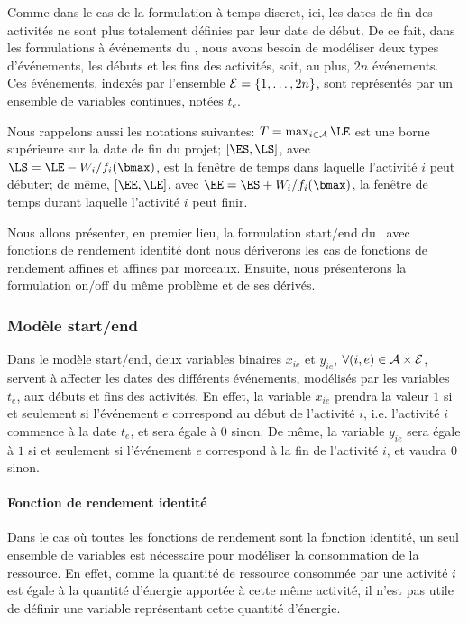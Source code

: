Comme dans le cas de la formulation à temps discret, ici, les dates de
fin des activités ne sont plus totalement définies par leur date de
début. De ce fait, dans les formulations à événements du \CECSP, nous
avons besoin de modéliser deux types d'événements, les débuts et les
fins des activités, soit, au plus, $2n$ événements. Ces événements,
indexés par l'ensemble ${\cal E}=\{1,\dots,2n\}$, sont représentés par un
ensemble de variables continues, notées $t_e$.

Nous rappelons aussi les notations suivantes: $T=\max_{i \in \A}
\LE$ est une borne supérieure sur la date de fin du projet;
$[\ES,\LS]$, avec $\LS= \LE-W_i/f_i(\bmax)$, est la fenêtre de temps
dans laquelle l'activité $i$ peut débuter; de même, $[\EE,\LE]$,
avec $\EE=\ES + W_i/f_i(\bmax)$, la fenêtre de temps durant laquelle
l'activité $i$ peut finir.

Nous allons présenter, en premier lieu, la formulation start/end du
\CECSP~avec fonctions de rendement identité dont nous dériverons 
les cas de fonctions de rendement affines et affines par morceaux.
Ensuite, nous présenterons la formulation on/off du même problème et
de ses dérivés.

\subsubsection{Modèle start/end}

Dans le modèle start/end, deux variables binaires $x_{ie}$ et
$y_{ie}$, $\forall (i,e) \in {\cal A}\times {\cal E}$, 
servent à affecter les dates des différents événements, modélisés par
les variables $t_e$, aux débuts et fins des activités. En effet, la
variable $x_{ie}$ prendra la valeur $1$ si et seulement si l'événement
$e$ correspond au début de l'activité $i$, i.e. l'activité $i$
commence à la date $t_e$, et sera égale à $0$ sinon. De même, la
variable $y_{ie}$ sera égale à $1$ si et seulement si l'événement $e$
correspond à la fin de l'activité $i$, et vaudra $0$ sinon.

\paragraph{Fonction de rendement identité}

Dans le cas où toutes les fonctions de rendement sont la fonction
identité, un seul ensemble de variables est nécessaire pour modéliser
la consommation de la ressource. En effet, comme la quantité de
ressource consommée par une activité $i$ est égale à la quantité
d'énergie apportée à cette même activité, il n'est pas utile de
définir une variable représentant cette quantité d'énergie.

